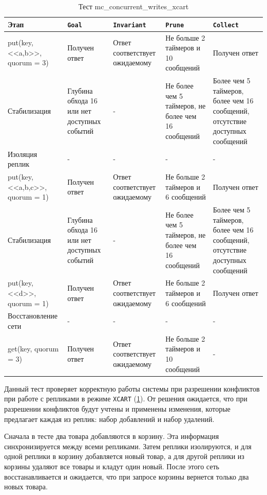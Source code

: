 \documentclass[a4paper,12pt]{extarticle}
\newcommand{\goal}[0]{\texttt{Goal}}
\newcommand{\prune}[0]{\texttt{Prune}}
\newcommand{\invariant}[0]{\texttt{Invariant}}
\newcommand{\collect}[0]{\texttt{Collect}}
\begin{document}
\begin{table}[htbp]
    \caption{Тест mc\_concurrent\_writes\_xcart}
    \begin{center}
        \begin{tabular}{|p{}|p{}|p{}|p{}|p{} |}
            \hline
    Этап & \goal & \invariant & \prune & \collect \\
    \hline
    put(key, <<a,b>>, quorum = 3)  & Получен ответ &  Ответ соответствует ожидаемому & Не больше 2 таймеров и 10 сообщений & Получен ответ \\
    \hline
    Стабилизация  & Глубина обхода 16 или нет доступных событий & - & Не более чем 5 таймеров, не более чем 16 сообщений & Более чем 5 таймеров, более чем 16 сообщений, отсутствие доступных сообщений  \\
    \hline
    Изоляция реплик & - & - & - & - \\
    \hline
    put(key, <<a,b,c>>, quorum = 1)  & Получен ответ & Ответ соответствует ожидаемому & Не больше 2 таймеров и 6 сообщений & Получен ответ \\
    \hline
    Стабилизация  & Глубина обхода 16 или нет доступных событий & - & Не более чем 5 таймеров, не более чем 16 сообщений & Более чем 5 таймеров, более чем 16 сообщений, отсутствие доступных сообщений  \\
    \hline
    put(key, <<d>>, quorum = 1)  & Получен ответ & Ответ соответствует ожидаемому & Не больше 2 таймеров и 6 сообщений & Получен ответ \\
    \hline
    Восстановление сети & - & - & - & - \\
    \hline
    get(key, quorum = 3)  & Получен ответ & Ответ соответствует ожидаемому & Не больше 2 таймеров и 10 сообщений  & - \\
    \hline
    \end{tabular}
    \label{testxcart}
    \end{center}
\end{table}

Данный тест проверяет корректную работы системы при разрешении конфликтов при работе с репликами в режиме \texttt{XCART} (\cref{testxcart}).
От решения ожидается, что при разрешении конфликтов будут учтены и применены изменения, которые предлагает каждая из реплик: набор добавлений и набор удалений.

Сначала в тесте два товара добавляются в корзину.
Эта информация синхронизируется между всеми репликами.
Затем реплики изолируются, и для одной реплики в корзину добавляется новый товар, а для другой реплики из корзины удаляют все товары и кладут один новый.
После этого сеть восстанавливается и ожидается, что при запросе корзины вернется только два новых товара.
\end{document}
